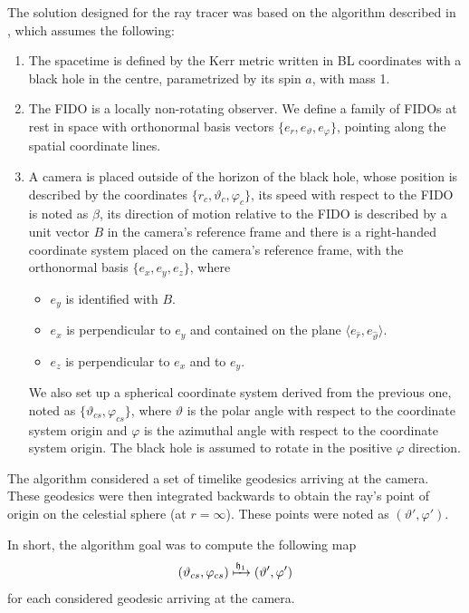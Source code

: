 The solution designed for the ray tracer was based on the algorithm described in \cite{thorne15}, which assumes the following:
\begin{enumerate}
	\item The spacetime is defined by the Kerr metric written in \ac{BL} coordinates with a black hole in the centre, parametrized by its spin $a$, with mass 1.
	\item The \ac{FIDO} is a locally non-rotating observer. We define a family of \acp{FIDO} at rest in space with orthonormal basis vectors $\{e_r, e_\vartheta, e_\varphi\}$, pointing along the spatial coordinate lines.
	\item A camera is placed outside of the horizon of the black hole, whose position is described by the coordinates $\{r_c, \vartheta_c, \varphi_c\}$, its speed with respect to the \ac{FIDO} is noted as $\beta$, its direction of motion relative to the \ac{FIDO} is described by a unit vector $B$ in the camera's reference frame and there is a right-handed coordinate system placed on the camera's reference frame, with the orthonormal basis $\{e_x, e_y, e_z\}$, where
		\begin{itemize}
			\item $e_y$ is identified with $B$.
			\item $e_x$ is perpendicular to $e_y$ and contained on the plane $\langle e_{\widehat{r}}, e_{\widehat{\vartheta}} \rangle$.
			\item $e_z$ is perpendicular to $e_x$ and to $e_y$.
		\end{itemize}
		We also set up a spherical coordinate system derived from the previous one, noted as $\{\vartheta_{cs}, \varphi_{cs}\}$, where $\vartheta$ is the polar angle with respect to the coordinate system origin and $\varphi$ is the azimuthal angle with respect to the coordinate system origin. The black hole is assumed to rotate in the positive $\varphi$ direction.
\end{enumerate}

The algorithm considered a set of timelike geodesics arriving at the camera. These geodesics were then integrated backwards to obtain the ray's point of origin on the celestial sphere (at $r = \infty$). These points were noted as $(\vartheta', \varphi')$.

In short, the algorithm goal was to compute the following map
\begin{equation}
\label{eq:initmap}
(\vartheta_{cs}, \varphi_{cs}) \xmapsto{\mathfrak{h}_1} (\vartheta', \varphi')
\end{equation}
for each considered geodesic arriving at the camera.

